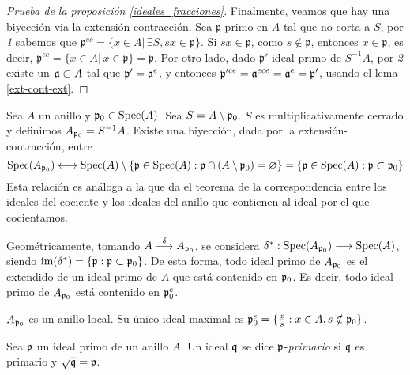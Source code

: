 \documentclass[../main.tex]{subfiles}
\begin{document}
\begin{proof}[Prueba de la proposición \ref{ideales_fracciones}]
	Finalmente, veamos que hay una biyección via la extensión-contracción. Sea $\mathfrak{p}$ primo en $A$ tal que no corta a $S$, por \textit{1} sabemos que $\mathfrak{p}^{ec} = \{x\in A \vert \, \exists S, sx\in\mathfrak{p} \}$. Si $sx \in \mathfrak{p}$, como $s \not \in \mathfrak{p}$, entonces $x \in \mathfrak{p}$, es decir,  $\mathfrak{p}^{ec} = \{x\in A \vert \, x \in\mathfrak{p} \} = \mathfrak{p}$.
	Por otro lado, dado $\mathfrak{p}'$ ideal primo de $S^{-1}A$, por \textit{2} existe un $\mathfrak{a} \subset A$ tal que $\mathfrak{p}' = \mathfrak{a}^e$, y entonces $\mathfrak{p}'^{ce} = \mathfrak{a}^{ece} = \mathfrak{a}^e = \mathfrak{p}'$, usando el lema \ref{ext-cont-ext}.

\end{proof}

	\begin{example}
Sea $A$ un anillo y $\mathfrak{p}_0\in \operatorname{Spec}(A)$. Sea $S=A\setminus\mathfrak{p}_0$. $S$ es multiplicativamente cerrado y definimos $A_{\mathfrak{p}_0}=S^{-1}A$. Existe una biyección, dada por la extensión-contracción, entre $$\operatorname{Spec}(A_{\mathfrak{p}_0})\longleftrightarrow \operatorname{Spec}(A)\setminus\{\mathfrak{p}\in \operatorname{Spec}(A):\mathfrak{p}\cap(A\setminus\mathfrak{p}_0)=\varnothing\}=\{\mathfrak{p}\in \operatorname{Spec}(A):\mathfrak{p}\subset\mathfrak{p}_0\}$$
Esta relación es análoga a la que da el teorema de la correspondencia entre los ideales del cociente y los ideales del anillo que contienen al ideal por el que cocientamos.

Geométricamente, tomando $A\overset{\delta}{\longrightarrow}A_{\mathfrak{p}_0}$, se considera $\delta^{\ast}:\operatorname{Spec}(A_{\mathfrak{p}_0})\longrightarrow \operatorname{Spec}(A)$, siendo $\operatorname{im}(\delta^{\ast})=\{\mathfrak{p}:\mathfrak{p}\subset \mathfrak{p}_0\}$. De esta forma, todo ideal primo de $A_{\mathfrak{p}_0}$ es el extendido de un ideal primo de $A$ que está contenido en $\mathfrak{p}_0$. Es decir, todo ideal primo de $A_{\mathfrak{p}_0}$ está contenido en $\mathfrak{p}_0^e$.

$A_{\mathfrak{p}_0}$ es un anillo local. Su único ideal maximal es $\mathfrak{p}_0^e=\{\frac{x}{s}:x\in A, s\notin\mathfrak{p}_0\}$.
\end{example}

\begin{definition}
Sea $\mathfrak{p}$ un ideal primo de un anillo $A$. Un ideal $\mathfrak{q}$ se dice $\mathfrak{p}$-\textit{primario} si $\mathfrak{q}$ es primario y $\sqrt{\mathfrak{q}}=\mathfrak{p}$.
\end{definition}
\end{document}
